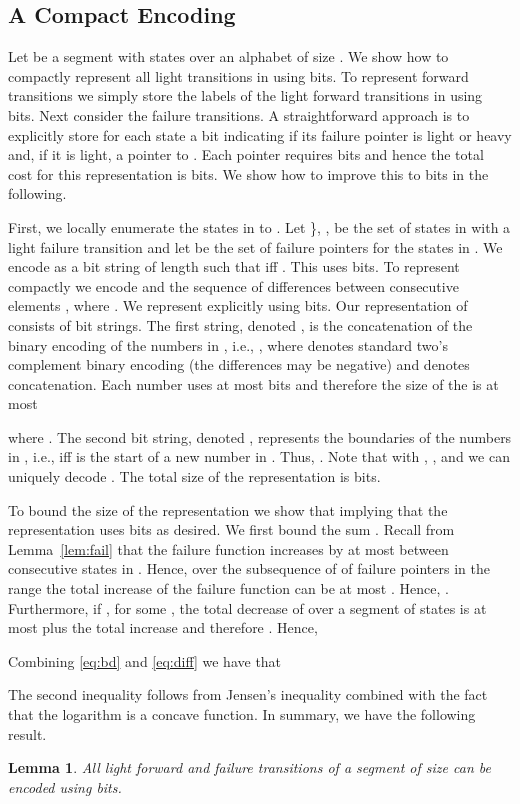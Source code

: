 \documentclass{article}
\newtheorem{lemma}{Lemma}
\begin{document}
\subsection{A Compact Encoding}\label{sec:encoding}
Let  be a segment with  states over an alphabet of size
. We show how to compactly represent all light transitions in
 using  bits. To represent forward transitions we
simply store the labels of the  light forward transitions in 
using  bits. Next consider the
failure transitions. A straightforward approach is to explicitly store
for each state  a bit indicating if its failure pointer is
light or heavy and, if it is light, a pointer to . Each
pointer requires  bits and hence the total cost for
this representation is  bits. We show how to improve this
to  bits in the following.


First, we locally enumerate the states in  to . Let \}, , be the
set of states in  with a light failure transition and let  be the set of failure pointers for
the states in . We encode  as a bit string  of length 
such that  iff . This uses  bits. To represent
 compactly we encode  and the sequence of differences
between consecutive elements ,
where . We represent 
explicitly using  bits. Our representation of 
consists of  bit strings. The first string, denoted , is the
concatenation of the binary encoding of the numbers in , i.e., , where  denotes
standard two's complement binary encoding (the differences may be
negative) and  denotes concatenation. Each number  uses at
most  bits and therefore the size of the  is at
most

where . The second bit string, denoted
, represents the boundaries of the numbers in , i.e.,
 iff  is the start of a new number in . Thus,
. Note that with , , and  we can
uniquely decode . The total size of the representation is
 bits.


To bound the size of the representation we show that 
implying that the representation uses  bits as desired. We first bound the sum . Recall from Lemma~\ref{lem:fail} that the failure function
increases by at most  between consecutive states in . Hence,
over the subsequence  of  of failure pointers in the range
 the total increase of the failure function can be at most
. Hence, . Furthermore, if ,
for some , the total decrease of  over a segment of
 states is at most  plus the total increase and therefore
. Hence,

Combining \eqref{eq:bd} and \eqref{eq:diff} we have that 

The second inequality follows from Jensen's inequality combined with
the fact that the logarithm is a concave function. In summary, we have
the following result.
\begin{lemma}\label{lem:encoding}
  All light forward and failure transitions of a segment of size 
  can be encoded using  bits.
\end{lemma}
\end{document}
